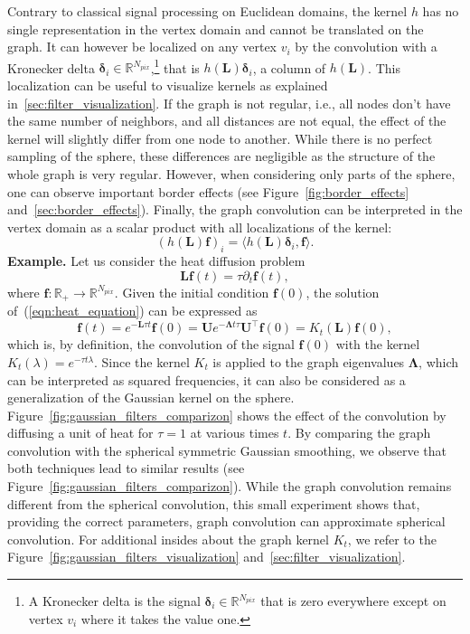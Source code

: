 \documentclass[final,twocolumn,3p,times,authoryear]{elsarticle}
\newcommand{\figref}[1]{Figure~\ref{fig:#1}}
\newcommand{\eqnref}[1]{(\ref{eqn:#1})}
\renewcommand{\b}[1]{{\bm{#1}}}   %
\newcommand{\1}{\b{1}}              %
\newcommand{\0}{\b{0}}              %
\newcommand{\g}[1]{\b{#1}}
\renewcommand{\L}{\b{L}}
\newcommand{\U}{\b{U}}
\newcommand{\f}{\b{f}}
\newcommand{\trans}{^\intercal}
\newcommand{\R}{\mathbb{R}}
\newcommand{\bLambda}{\b{\Lambda}}
\begin{document}
Contrary to classical signal processing on Euclidean domains, the kernel $h$ has no single representation in the vertex domain and cannot be translated on the graph. It can however be localized on any vertex $v_i$ by the convolution with a Kronecker delta $\b \delta_i \in \R^{N_{pix}}$,\footnote{A Kronecker delta is the signal $\b \delta_i \in \R^{N_{pix}}$ that is zero everywhere except on vertex $v_i$ where it takes the value one.} that is $h(\L) \b \delta_i$, a column of $h(\L)$.
This localization can be useful to visualize kernels as explained in~\ref{sec:filter_visualization}.
If the graph is not regular, i.e., all nodes don't have the same number of neighbors, and all distances are not equal, the effect of the kernel will slightly differ from one node to another. While there is no perfect sampling of the sphere, these differences are negligible as the structure of the whole graph is very regular. However, when considering only parts of the sphere, one can observe important border effects (see \figref{border_effects} and~\ref{sec:border_effects}).
Finally, the graph convolution can be interpreted in the vertex domain as a scalar product with all localizations of the kernel:
\begin{equation} \label{eqn:graph_convolution_spatial}
	(h(\L) \f)_i = \langle h(\L) \b \delta_i, \f \rangle.
\end{equation}
\textbf{Example.}
Let us consider the heat diffusion problem
\begin{equation} \label{eqn:heat_equation}
	\L \b{f}(t) = \tau \partial_t \b{f}(t),
\end{equation}
where $\b{f}: \R_+ \rightarrow \R^{N_{pix}}$. Given the initial condition
$\b{f}(0)$, the solution of~\eqnref{heat_equation} can be expressed as
\begin{equation*}
	\b{f}(t) = e^{-\L \tau t} \b{f}(0) = \U e^{-\bLambda t \tau} \U\trans \g{f}(0) = K_t(\L) \b{f}(0),
\end{equation*}
which is, by definition, the convolution of the signal $\b{f}(0)$ with the kernel $K_t(\lambda)=e^{-\tau t \lambda}$. Since the kernel $K_t$ is applied to the graph eigenvalues $\bLambda$, which can be interpreted as squared frequencies, it can also be considered as a generalization of the Gaussian kernel on the sphere. \figref{gaussian_filters_comparizon} shows the effect of the convolution by diffusing a unit of heat for $\tau=1$ at various times $t$. By comparing the graph convolution with the spherical symmetric Gaussian smoothing, we observe that both techniques lead to similar results (see \figref{gaussian_filters_comparizon}). While the graph convolution remains different from the spherical convolution, this small experiment shows that, providing the correct parameters, graph convolution can approximate spherical convolution. For additional insides about the graph kernel $K_t$, we refer to the \figref{gaussian_filters_visualization} and~\ref{sec:filter_visualization}.
\end{document}
